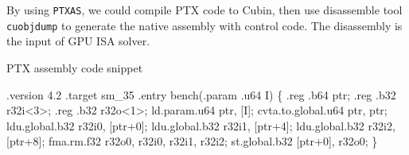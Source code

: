 By using {\tt PTXAS}, we could compile PTX code to Cubin, then use disassemble
tool {\tt cuobjdump} to generate the native assembly with control code. The disassembly is the input of GPU ISA solver.
\begin{algorithm}
    \caption{PTX assembly code snippet}
  \label{gemm}
  \begin{algorithmic}[1]
      \State \hspace{2mm} .version 4.2
      \State \hspace{2mm} .target sm\_35
      \State \hspace {2mm} .entry bench(.param .u64 I) \{
          \State \hspace{5mm}   .reg .b64   ptr;
\State   \hspace{5mm}    .reg .b32   r32i<3>;
\State   \hspace{5mm}    .reg .b32   r32o<1>;
\State  \hspace{5mm}     ld.param.u64 ptr, [I];
\State  \hspace{5mm}     cvta.to.global.u64  ptr, ptr;
\State   \hspace{5mm}    ldu.global.b32 r32i0, [ptr+0];
\State   \hspace{5mm}    ldu.global.b32 r32i1, [ptr+4];
\State  \hspace{5mm}     ldu.global.b32 r32i2, [ptr+8];
\State  \hspace{5mm}     fma.rm.f32 r32o0, r32i0, r32i1, r32i2;
\State   \hspace{5mm}    st.global.b32 [ptr+0], r32o0;
\State \}
  \end{algorithmic}
\end{algorithm}
